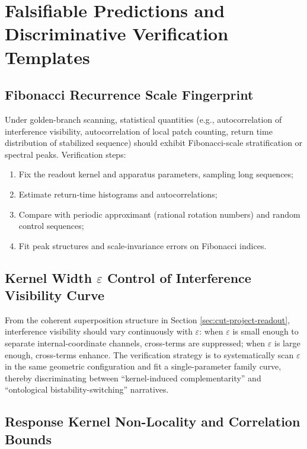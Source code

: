 \section{Falsifiable Predictions and Discriminative Verification Templates}\label{sec:falsifiable}

\subsection{Fibonacci Recurrence Scale Fingerprint}

Under golden-branch scanning, statistical quantities (e.g., autocorrelation of interference visibility, autocorrelation of local patch counting, return time distribution of stabilized sequence) should exhibit Fibonacci-scale stratification or spectral peaks. Verification steps:
\begin{enumerate}
  \item Fix the readout kernel and apparatus parameters, sampling long sequences;
  \item Estimate return-time histograms and autocorrelations;
  \item Compare with periodic approximant (rational rotation numbers) and random control sequences;
  \item Fit peak structures and scale-invariance errors on Fibonacci indices.
\end{enumerate}

\subsection{Kernel Width \texorpdfstring{$\varepsilon$}{epsilon} Control of Interference Visibility Curve}

From the coherent superposition structure in Section \ref{sec:cut-project-readout}, interference visibility should vary continuously with $\varepsilon$: when $\varepsilon$ is small enough to separate internal-coordinate channels, cross-terms are suppressed; when $\varepsilon$ is large enough, cross-terms enhance. The verification strategy is to systematically scan $\varepsilon$ in the same geometric configuration and fit a single-parameter family curve, thereby discriminating between ``kernel-induced complementarity'' and ``ontological bistability-switching'' narratives.

\subsection{Response Kernel Non-Locality and Correlation Bounds}

